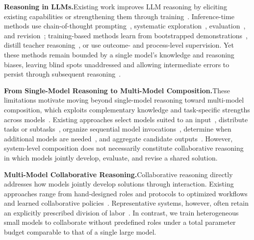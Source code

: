 \documentclass{article} %
\begin{document}
\noindent\textbf{Reasoning in LLMs.}\quad Existing work improves LLM reasoning by eliciting existing capabilities or strengthening them through training~\citep{zhao2026selfdistilled,li2026rise,liu2026spade}. Inference-time methods use chain-of-thought prompting~\citep{wei2022chain}, systematic exploration~\citep{hariri2026regimes,li2026tailsearch}, evaluation~\citep{wu2026stv}, and revision~\citep{yang2026retree}; training-based methods learn from bootstrapped demonstrations~\citep{zelikman2022star,dong2026bird}, distill teacher reasoning~\citep{yang2025supercorrect,liu2026sparse,fu2026onetraining}, or use outcome- and process-level supervision. Yet these methods remain bounded by a single model's knowledge and reasoning biases, leaving blind spots unaddressed and allowing intermediate errors to persist through subsequent reasoning~\citep{xie2026breadth}.


\noindent\textbf{From Single-Model Reasoning to Multi-Model Composition.}\quad These limitations motivate moving beyond single-model reasoning toward multi-model composition, which exploits complementary knowledge and task-specific strengths across models~\citep{yang2026corl,zhang2026hacrl,huot2026meaningful}. Existing approaches select models suited to an input~\citep{ong2025routellm,cao2026scope,feng2026llmrouter,fisch2026pandora}, distribute tasks or subtasks~\citep{agashe2025agents2,chen2026mhgpo}, organize sequential model invocations~\citep{dekoninck2025routing,li2026progrouter}, determine when additional models are needed~\citep{rajib2026gatedmemory,qin2026atlas}, and aggregate candidate outputs~\citep{zhang2026agentrouter}. However, system-level composition does not necessarily constitute collaborative reasoning in which models jointly develop, evaluate, and revise a shared solution.

\noindent\textbf{Multi-Model Collaborative Reasoning.}\quad Collaborative reasoning directly addresses how models jointly develop solutions through interaction. Existing approaches range from hand-designed roles and protocols to optimized workflows~\citep{hu2025adas,zhou2026mass,lee2026mega,koh2026graft} and learned collaborative policies~\citep{xue2026comas,zhang2026metaagentx}. Representative systems, however, often retain an explicitly prescribed division of labor~\citep{zhao2026strongermas,feng2026drmas,ding2026apex}. In contrast, we train heterogeneous small models to collaborate without predefined roles under a total parameter budget comparable to that of a single large model.

\vspace{-0.5em}
\end{document}
